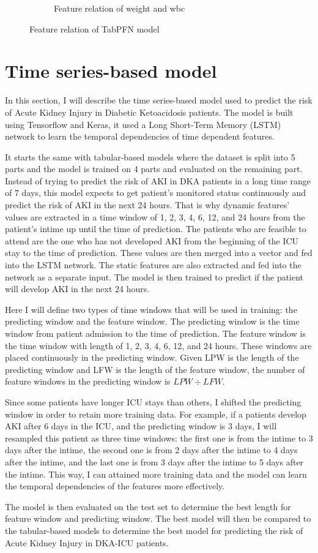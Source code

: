 \documentclass[../main.tex]{subfiles}
\begin{document}
\begin{figure}
\begin{subfigure}{0.45\textwidth}
        \caption{Feature relation of weight and wbc}
        \label{fig:tabpfn-weight-wbc}
    \end{subfigure}

    \caption{Feature relation of TabPFN model}
    \label{fig:tabpfn-feature-relation}
\end{figure}


\section{Time series-based model}

In this section, I will describe the time series-based model used to predict the risk of Acute Kidney Injury in Diabetic Ketoacidosis patients.
The model is built using Tensorflow and Keras, it used a Long Short-Term Memory (LSTM) network to learn the temporal dependencies of time dependent features.

It starts the same with tabular-based models where the dataset is split into 5 parts and the model is trained on 4 parts and evaluated on the remaining part.
Instead of trying to predict the risk of AKI in DKA patients in a long time range of 7 days, this model expects to get patient's monitored status continuously and predict the risk of AKI in the next 24 hours.
That is why dynamic features' values are extracted in a time window of 1, 2, 3, 4, 6, 12, and 24 hours from the patient's intime up until the time of prediction.
The patients who are feasible to attend are the one who has not developed AKI from the beginning of the ICU stay to the time of prediction.
These values are then merged into a vector and fed into the LSTM network.
The static features are also extracted and fed into the network as a separate input.
The model is then trained to predict if the patient will develop AKI in the next 24 hours.

Here I will define two types of time windows that will be used in training: the predicting window and the feature window.
The predicting window is the time window from patient admission to the time of prediction.
The feature window is the time window with length of 1, 2, 3, 4, 6, 12, and 24 hours.
These windows are placed continuously in the predicting window.
Given LPW is the length of the predicting window and LFW is the length of the feature window, the number of feature windows in the predicting window is $LPW \div LFW$.

Since some patients have longer ICU stays than others, I shifted the predicting window in order to retain more training data.
For example, if a patients develop AKI after 6 days in the ICU, and the predicting window is 3 days, I will resampled this patient as three time windows: the first one is from the intime to 3 days after the intime, the second one is from 2 days after the intime to 4 days after the intime, and the last one is from 3 days after the intime to 5 days after the intime. 
This way, I can attained more training data and the model can learn the temporal dependencies of the features more effectively.

The model is then evaluated on the test set to determine the best length for feature window and predicting window.
The best model will then be compared to the tabular-based models to determine the best model for predicting the risk of Acute Kidney Injury in DKA-ICU patients.
\end{document}
